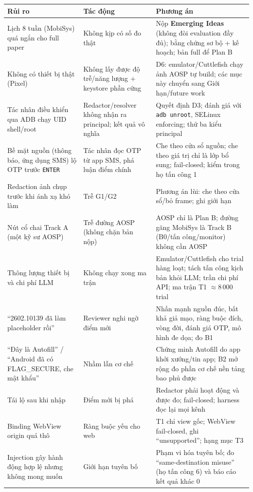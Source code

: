 \documentclass[11pt,a4paper]{article}
\newcommand{\code}[1]{\texttt{\small #1}}
\begin{document}
\begin{longtable}{@{}p{4.1cm}p{4.9cm}p{6.0cm}@{}}
\toprule
\textbf{Rủi ro} & \textbf{Tác động} & \textbf{Phương án} \\
\midrule
\endhead
Lịch 8 tuần (MobiSys) quá ngắn cho full paper & Không kịp có số đo thật & Nộp \textbf{Emerging Ideas} (không đòi evaluation đầy đủ); bằng chứng sơ bộ + kế hoạch; bản full để Plan B \\
Không có thiết bị thật (Pixel) & Không lấy được độ trễ/năng lượng + keystore phần cứng & D6: emulator/Cuttlefish chạy ảnh AOSP tự build; các mục này chuyển sang Giới hạn/future work \\
Tác nhân điều khiển qua ADB chạy UID shell/root & Redactor/resolver không nhận ra principal; kết quả vô nghĩa & Quyết định D3; đánh giá với \code{adb unroot}, SELinux enforcing; thử ba kiểu principal \\
Bề mặt nguồn (thông báo, ứng dụng SMS) lộ OTP trước \code{ENTER} & Tác nhân đọc OTP từ app SMS, phá luận điểm chính & Che theo cửa sổ nguồn; che theo giá trị chỉ là lớp bổ sung; fail-closed; kiểm trong họ tấn công 1 \\
Redaction ảnh chụp trước khi ánh xạ khó làm & Trễ G1/G2 & Phương án lùi: che theo cửa sổ/bỏ frame; ghi giới hạn \\
Nút cổ chai Track A (một kỹ sư AOSP) & Trễ đường AOSP (không chặn bản nộp) & AOSP chỉ là Plan B; đường găng MobiSys là Track B (B0/tấn công/monitor) không cần AOSP \\
Thông lượng thiết bị và chi phí LLM & Không chạy xong ma trận & Emulator/Cuttlefish cho trial hàng loạt; tách tấn công kịch bản khỏi LLM; trần chi phí API; ma trận T1 $\approx 8\,000$ trial \\
``2602.10139 đã làm placeholder rồi'' & Reviewer nghi ngờ điểm mới & Nhấn mạnh nguồn đúc, bất khả giả mạo, ràng buộc đích, vòng đời, đánh giá OTP, mô hình đe dọa; đo B1 \\
``Đây là Autofill'' / ``Android đã có FLAG\_SECURE, che mật khẩu'' & Nhầm lẫn cơ chế & Chứng minh Autofill do app khởi xướng/tin app; B2 mở rộng đo phần cơ chế nền tảng bao phủ được \\
Tái lộ sau khi nhập & Điểm mới bị phá & Redactor phải hoạt động và được đo; fail-closed; harness đọc lại mọi kênh \\
Binding WebView origin quá thô & Ràng buộc yếu cho web & T1 chỉ view gốc; WebView fail-closed, ghi ``unsupported''; hạng mục T3 \\
Injection gây hành động hợp lệ nhưng không mong muốn & Giới hạn tuyên bố & Phạm vi hóa tuyên bố; đo ``same-destination misuse'' (họ tấn công 6) và báo cáo kết quả khác 0 \\

\end{longtable}
\end{document}
